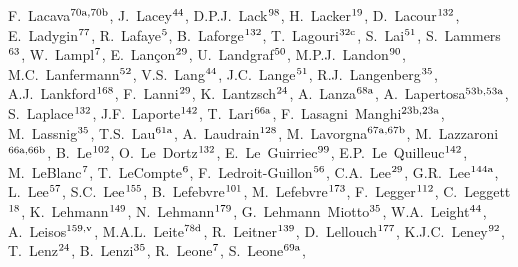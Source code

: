 \begin{flushleft}
F.~Lacava$^\textrm{\scriptsize 70a,70b}$,    
J.~Lacey$^\textrm{\scriptsize 44}$,    
D.P.J.~Lack$^\textrm{\scriptsize 98}$,    
H.~Lacker$^\textrm{\scriptsize 19}$,    
D.~Lacour$^\textrm{\scriptsize 132}$,    
E.~Ladygin$^\textrm{\scriptsize 77}$,    
R.~Lafaye$^\textrm{\scriptsize 5}$,    
B.~Laforge$^\textrm{\scriptsize 132}$,    
T.~Lagouri$^\textrm{\scriptsize 32c}$,    
S.~Lai$^\textrm{\scriptsize 51}$,    
S.~Lammers$^\textrm{\scriptsize 63}$,    
W.~Lampl$^\textrm{\scriptsize 7}$,    
E.~Lan\c{c}on$^\textrm{\scriptsize 29}$,    
U.~Landgraf$^\textrm{\scriptsize 50}$,    
M.P.J.~Landon$^\textrm{\scriptsize 90}$,    
M.C.~Lanfermann$^\textrm{\scriptsize 52}$,    
V.S.~Lang$^\textrm{\scriptsize 44}$,    
J.C.~Lange$^\textrm{\scriptsize 51}$,    
R.J.~Langenberg$^\textrm{\scriptsize 35}$,    
A.J.~Lankford$^\textrm{\scriptsize 168}$,    
F.~Lanni$^\textrm{\scriptsize 29}$,    
K.~Lantzsch$^\textrm{\scriptsize 24}$,    
A.~Lanza$^\textrm{\scriptsize 68a}$,    
A.~Lapertosa$^\textrm{\scriptsize 53b,53a}$,    
S.~Laplace$^\textrm{\scriptsize 132}$,    
J.F.~Laporte$^\textrm{\scriptsize 142}$,    
T.~Lari$^\textrm{\scriptsize 66a}$,    
F.~Lasagni~Manghi$^\textrm{\scriptsize 23b,23a}$,    
M.~Lassnig$^\textrm{\scriptsize 35}$,    
T.S.~Lau$^\textrm{\scriptsize 61a}$,    
A.~Laudrain$^\textrm{\scriptsize 128}$,    
M.~Lavorgna$^\textrm{\scriptsize 67a,67b}$,    
M.~Lazzaroni$^\textrm{\scriptsize 66a,66b}$,    
B.~Le$^\textrm{\scriptsize 102}$,    
O.~Le~Dortz$^\textrm{\scriptsize 132}$,    
E.~Le~Guirriec$^\textrm{\scriptsize 99}$,    
E.P.~Le~Quilleuc$^\textrm{\scriptsize 142}$,    
M.~LeBlanc$^\textrm{\scriptsize 7}$,    
T.~LeCompte$^\textrm{\scriptsize 6}$,    
F.~Ledroit-Guillon$^\textrm{\scriptsize 56}$,    
C.A.~Lee$^\textrm{\scriptsize 29}$,    
G.R.~Lee$^\textrm{\scriptsize 144a}$,    
L.~Lee$^\textrm{\scriptsize 57}$,    
S.C.~Lee$^\textrm{\scriptsize 155}$,    
B.~Lefebvre$^\textrm{\scriptsize 101}$,    
M.~Lefebvre$^\textrm{\scriptsize 173}$,    
F.~Legger$^\textrm{\scriptsize 112}$,    
C.~Leggett$^\textrm{\scriptsize 18}$,    
K.~Lehmann$^\textrm{\scriptsize 149}$,    
N.~Lehmann$^\textrm{\scriptsize 179}$,    
G.~Lehmann~Miotto$^\textrm{\scriptsize 35}$,    
W.A.~Leight$^\textrm{\scriptsize 44}$,    
A.~Leisos$^\textrm{\scriptsize 159,v}$,    
M.A.L.~Leite$^\textrm{\scriptsize 78d}$,    
R.~Leitner$^\textrm{\scriptsize 139}$,    
D.~Lellouch$^\textrm{\scriptsize 177}$,    
K.J.C.~Leney$^\textrm{\scriptsize 92}$,    
T.~Lenz$^\textrm{\scriptsize 24}$,    
B.~Lenzi$^\textrm{\scriptsize 35}$,    
R.~Leone$^\textrm{\scriptsize 7}$,    
S.~Leone$^\textrm{\scriptsize 69a}$,    

\end{flushleft}
